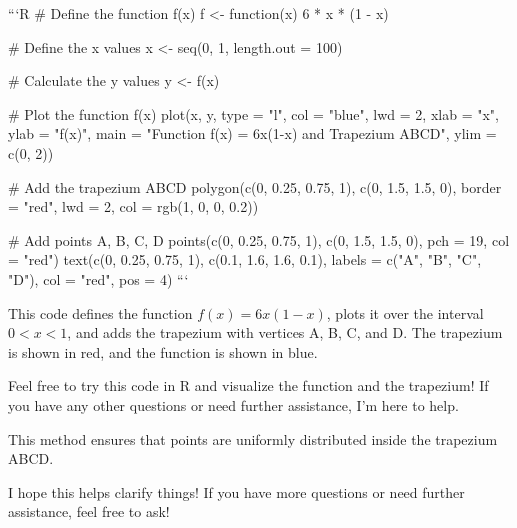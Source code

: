 ```R
# Define the function f(x)
f <- function(x) {
  6 * x * (1 - x)
}

# Define the x values
x <- seq(0, 1, length.out = 100)

# Calculate the y values
y <- f(x)

# Plot the function f(x)
plot(x, y, type = "l", col = "blue", lwd = 2, 
     xlab = "x", ylab = "f(x)", 
     main = "Function f(x) = 6x(1-x) and Trapezium ABCD",
     ylim = c(0, 2))

# Add the trapezium ABCD
polygon(c(0, 0.25, 0.75, 1), c(0, 1.5, 1.5, 0), border = "red", lwd = 2, col = rgb(1, 0, 0, 0.2))

# Add points A, B, C, D
points(c(0, 0.25, 0.75, 1), c(0, 1.5, 1.5, 0), pch = 19, col = "red")
text(c(0, 0.25, 0.75, 1), c(0.1, 1.6, 1.6, 0.1), labels = c("A", "B", "C", "D"), col = "red", pos = 4)
```

This code defines the function \( f(x) = 6x(1-x) \), plots it over the interval \( 0 < x < 1 \), and adds the trapezium with vertices A, B, C, and D. The trapezium is shown in red, and the function is shown in blue.

Feel free to try this code in R and visualize the function and the trapezium! If you have any other questions or need further assistance, I'm here to help.

This method ensures that points are uniformly distributed inside the trapezium ABCD.

I hope this helps clarify things! If you have more questions or need further assistance, feel free to ask!
